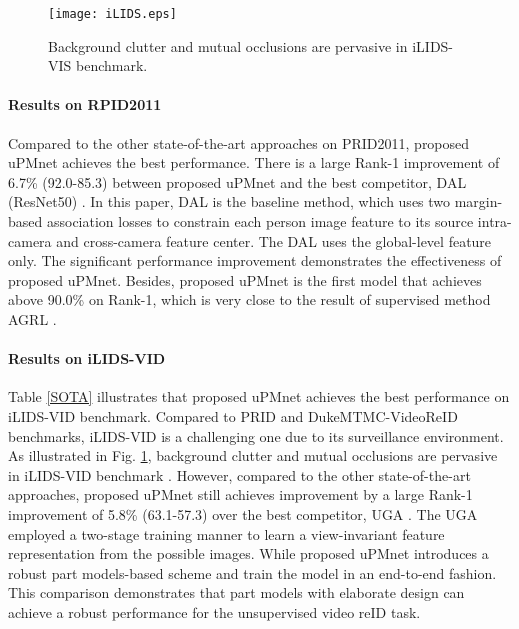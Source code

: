 \documentclass{cta-author}
\begin{document}
	\begin{figure}
		\centering
		\texttt{[image: iLIDS.eps]}
		\caption{Background clutter and mutual occlusions are pervasive in iLIDS-VIS benchmark.} \label{iLIDS}
	\end{figure}
	
	\paragraph{Results on RPID2011}
	Compared to the other state-of-the-art approaches on PRID2011, proposed uPMnet achieves the best performance. There is a large Rank-1 improvement of 6.7\% (92.0-85.3) between proposed uPMnet and the best competitor, DAL (ResNet50) \cite{RN87}. In this paper, DAL is the baseline method, which uses two margin-based association losses to constrain each person image feature to its source intra-camera and cross-camera feature center. The DAL uses the global-level feature only. The significant performance improvement demonstrates the effectiveness of proposed uPMnet. Besides, proposed uPMnet is the first model that achieves above 90.0\% on Rank-1, which is very close to the result of supervised method AGRL \cite{RN442}.
		
	\paragraph{Results on iLIDS-VID}
	Table \ref{SOTA} illustrates that proposed uPMnet achieves the best performance on iLIDS-VID benchmark. Compared to PRID and DukeMTMC-VideoReID benchmarks, iLIDS-VID is a challenging one due to its surveillance environment. As illustrated in Fig. \ref{iLIDS}, background clutter and mutual occlusions are pervasive in iLIDS-VID benchmark \cite{RN385}. However, compared to the other state-of-the-art approaches, proposed uPMnet still achieves improvement by a large Rank-1 improvement of 5.8\% (63.1-57.3) over the best competitor, UGA \cite{RN370}. The UGA employed a two-stage training manner to learn a view-invariant feature representation from the possible images. While proposed uPMnet introduces a robust part models-based scheme and train the model in an end-to-end fashion. This comparison demonstrates that part models with elaborate design can achieve a robust performance for the unsupervised video reID task.
\end{document}
